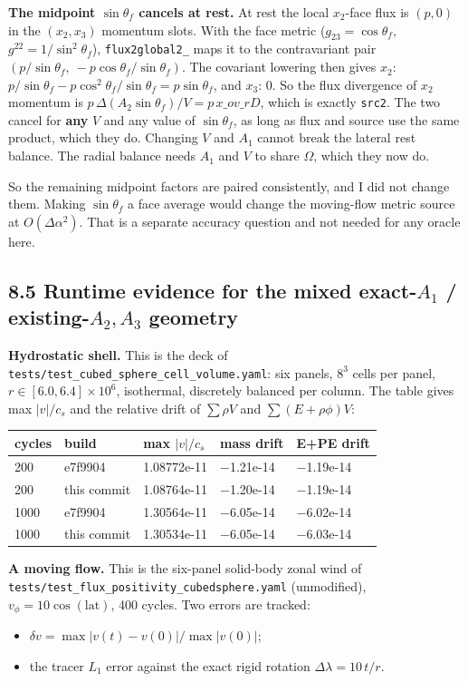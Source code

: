 \documentclass[11pt,a4paper]{article}
\begin{document}
\textbf{The midpoint $\sin\theta_f$ cancels at rest.} At rest the local $x_2$-face flux is $(p,0)$ in the
$(x_2, x_3)$ momentum slots. With the face metric ($g_{23}=\cos\theta_f$, $g^{22}=1/\sin^2\theta_f$),
\texttt{flux2global2\_} maps it to the contravariant pair $(p/\sin\theta_f,\ -p\cos\theta_f/\sin\theta_f)$. The covariant
lowering then gives
$x_2$: $p/\sin\theta_f - p\cos^2\theta_f/\sin\theta_f = p\sin\theta_f$, and $x_3$: $0$.
So the flux divergence of $x_2$ momentum is $p\,\Delta(A_2\sin\theta_f)/V = p\,x\_ov\_rD$, which is exactly
\texttt{src2}. The two cancel for \textbf{any} $V$ and any value of $\sin\theta_f$, as long as flux and source use the same
product, which they do. Changing $V$ and $A_1$ cannot break the lateral rest balance. The radial balance needs
$A_1$ and $V$ to share $\Omega$, which they now do.

So the remaining midpoint factors are paired consistently, and I did not change them. Making $\sin\theta_f$ a
face average would change the moving-flow metric source at $O(\Delta\alpha^2)$. That is a separate accuracy question
and not needed for any oracle here.

\subsection*{8.5 Runtime evidence for the mixed exact-$A_1$ / existing-$A_2,A_3$ geometry}

\textbf{Hydrostatic shell.} This is the deck of \texttt{tests/test\_cubed\_sphere\_cell\_volume.yaml}: six panels, $8^3$ cells
per panel, $r\in[6.0,6.4]\times10^6$, isothermal, discretely balanced per column. The table gives max $|v|/c_s$
and the relative drift of $\sum\rho V$ and $\sum(E+\rho\phi)V$:

\begin{longtable}{lllll}
\toprule
cycles & build & max $\lvert v\rvert/c_s$ & mass drift & E+PE drift \\
\midrule
200 & e7f9904 & 1.08772e-11 & −1.21e-14 & −1.19e-14 \\
200 & this commit & 1.08764e-11 & −1.20e-14 & −1.19e-14 \\
1000 & e7f9904 & 1.30564e-11 & −6.05e-14 & −6.02e-14 \\
1000 & this commit & 1.30534e-11 & −6.05e-14 & −6.03e-14 \\
\bottomrule
\end{longtable}

\textbf{A moving flow.} This is the six-panel solid-body zonal wind of \texttt{tests/test\_flux\_positivity\_cubedsphere.yaml}
(unmodified), $v_\phi = 10\cos(\text{lat})$, 400 cycles. Two errors are tracked:
\begin{itemize}
\item $\delta v=\max|v(t)-v(0)|/\max|v(0)|$;
\item the tracer $L_1$ error against the exact rigid rotation $\Delta\lambda = 10\,t/r$.
\end{itemize}
\end{document}
